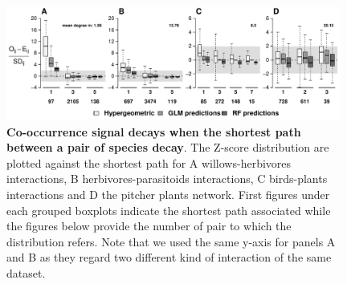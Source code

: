 \begin{figure}
\centering
\includegraphics[width=0.98000\textwidth]{chapitre3/figOrder.pdf}
\caption{\textbf{Co-occurrence signal decays when the shortest path
between a pair of species decay}. The Z-score distribution are plotted
against the shortest path for A willows-herbivores interactions, B
herbivores-parasitoids interactions, C birds-plants interactions and D
the pitcher plants network. First figures under each grouped boxplots
indicate the shortest path associated while the figures below provide
the number of pair to which the distribution refers. Note that we used
the same y-axis for panels A and B as they regard two different kind of
interaction of the same dataset.\label{fig:shtpth}}
\end{figure}

\newpage

